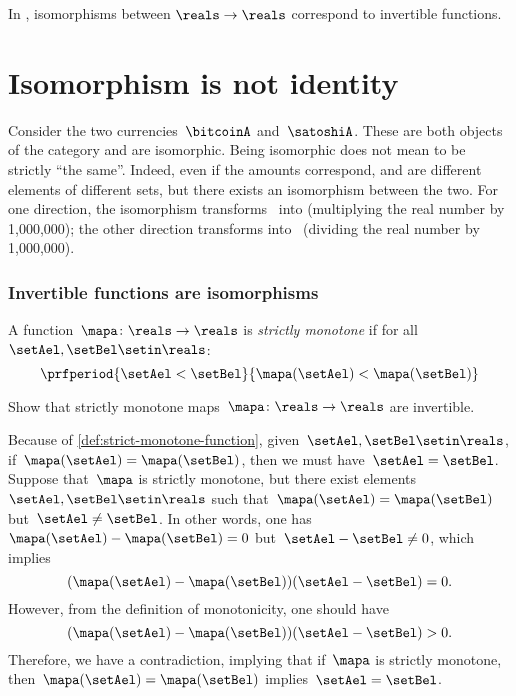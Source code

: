 \begin{example}
    In \Set, isomorphisms between $\reals\to \reals$ correspond to invertible functions.
\end{example}

\section{Isomorphism is not identity}
\begin{example}
    Consider the two currencies~$\bitcoinA$ and~$\satoshiA$.
    These are both objects of the category \Curr and are isomorphic.
    Being isomorphic does not mean to be strictly ``the same''.
    Indeed, even if the amounts correspond, \unit[1]{\bitcoinA} and \unit[1,000,000]{\satoshiA} are different elements of different sets, but there exists an isomorphism between the two.
    For one direction, the isomorphism transforms \bitcoinA \ into \satoshiA (multiplying the real number by 1,000,000);
    the other direction transforms \satoshiA into \bitcoinA \ (dividing the real number by 1,000,000).
\end{example}

\subsubsection{Invertible functions are isomorphisms}
\begin{definition}
    \label{def:strict-monotone-function}
    A function~$\mapa\colon \reals \to \reals$ is \emph{strictly monotone} if for all~$\setAel,\setBel\setin \reals$:
    \begin{equation}
        \prfperiod{\setAel < \setBel}{\mapa(\setAel)<\mapa(\setBel)}
    \end{equation}
\end{definition}
\begin{exercise}
    Show that strictly monotone maps~$\mapa\colon \reals \to \reals$ are invertible.
\end{exercise}
\begin{solution}
    Because of \cref{def:strict-monotone-function}, given~$\setAel,\setBel\setin \reals$, if~$\mapa(\setAel)=\mapa(\setBel)$, then we must have~$\setAel=\setBel$.
    Suppose that~$\mapa$ is strictly monotone, but there exist elements~$\setAel,\setBel\setin \reals$ such that~$\mapa(\setAel)=\mapa(\setBel)$ but~$\setAel\neq \setBel$.
    In other words, one has~$\mapa(\setAel)-\mapa(\setBel)=0$ but~$\setAel-\setBel\neq 0$, which implies
    \begin{equation}
        (\mapa(\setAel)-\mapa(\setBel))(\setAel-\setBel)=0.
    \end{equation}
    However, from the definition of monotonicity, one should have
    \begin{equation}
        (\mapa(\setAel)-\mapa(\setBel))(\setAel-\setBel)>0.
    \end{equation}
    Therefore, we have a contradiction, implying that if~$\mapa$ is strictly monotone, then~$\mapa(\setAel)=\mapa(\setBel)$ implies~$\setAel=\setBel$.
\end{solution}

